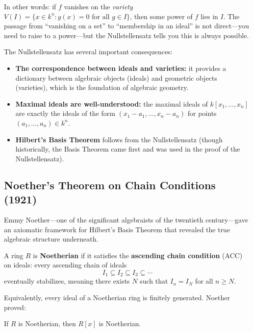 In other words: if $f$ vanishes on the \emph{variety} $V(I) = \{x \in k^n : g(x) = 0 \text{ for all } g \in I\}$, then some power of $f$ lies in $I$. The passage from ``vanishing on a set'' to ``membership in an ideal'' is not direct---you need to raise to a power---but the Nullstellensatz tells you this is always possible.

The Nullstellensatz has several important consequences:

\begin{itemize}
    \item \textbf{The correspondence between ideals and varieties:} it provides a dictionary between algebraic objects (ideals) and geometric objects (varieties), which is the foundation of algebraic geometry.
    \item \textbf{Maximal ideals are well-understood:} the maximal ideals of $k[x_1, \ldots, x_n]$ are exactly the ideals of the form $(x_1 - a_1, \ldots, x_n - a_n)$ for points $(a_1, \ldots, a_n) \in k^n$.
    \item \textbf{Hilbert's Basis Theorem} follows from the Nullstellensatz (though historically, the Basis Theorem came first and was used in the proof of the Nullstellensatz).
\end{itemize}

\subsection{Noether's Theorem on Chain Conditions (1921)}

Emmy Noether---one of the significant algebraists of the twentieth century---gave an axiomatic framework for Hilbert's Basis Theorem that revealed the true algebraic structure underneath.

\begin{definition}
A ring $R$ is \textbf{Noetherian} if it satisfies the \textbf{ascending chain condition} (ACC) on ideals: every ascending chain of ideals
\[
    I_1 \subseteq I_2 \subseteq I_3 \subseteq \cdots
\]
eventually stabilizes, meaning there exists $N$ such that $I_n = I_N$ for all $n \geq N$.
\end{definition}

Equivalently, every ideal of a Noetherian ring is finitely generated. Noether proved:

\begin{theorem}[Noether, 1921]\label{thm:noether}
If $R$ is Noetherian, then $R[x]$ is Noetherian.
\end{theorem}

